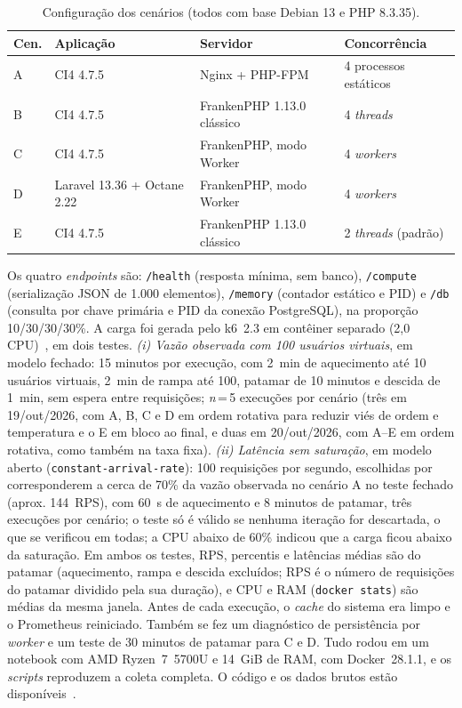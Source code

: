 \documentclass[sigconf, nonacm, screen, language=portuguese, language=spanish, language={main=english}]{acmart}
\begin{document}
\begin{table}[htb]
  \caption{Configuração dos cenários (todos com base Debian 13 e PHP 8.3.35).}
  \label{tab:config}
  \centering
  \footnotesize
  \setlength{\tabcolsep}{3pt}
  \begin{tabular}{llll}
    \toprule
    \textbf{Cen.} & \textbf{Aplicação} & \textbf{Servidor} & \textbf{Concorrência} \\
    \midrule
    A & CI4 4.7.5 & Nginx + PHP-FPM & 4 processos estáticos \\
    B & CI4 4.7.5 & FrankenPHP 1.13.0 clássico & 4 \textit{threads} \\
    C & CI4 4.7.5 & FrankenPHP, modo Worker & 4 \textit{workers} \\
    D & Laravel 13.36 + Octane 2.22 & FrankenPHP, modo Worker & 4 \textit{workers} \\
    E & CI4 4.7.5 & FrankenPHP 1.13.0 clássico & 2 \textit{threads} (padrão) \\
    \bottomrule
  \end{tabular}
\end{table}

Os quatro \textit{endpoints} são: \texttt{/health} (resposta mínima, sem banco), \texttt{/compute} (serialização JSON de 1.000 elementos), \texttt{/memory} (contador estático e PID) e \texttt{/db} (consulta por chave primária e PID da conexão PostgreSQL), na proporção 10/30/30/30\%. A carga foi gerada pelo k6~2.3 em contêiner separado (2,0 CPU)~\cite{grafana2024}, em dois testes. \emph{(i) Vazão observada com 100 usuários virtuais}, em modelo fechado: 15 minutos por execução, com 2~min de aquecimento até 10 usuários virtuais, 2~min de rampa até 100, patamar de 10 minutos e descida de 1~min, sem espera entre requisições; \emph{n}\,=\,5 execuções por cenário (três em 19/out/2026, com A, B, C e D em ordem rotativa para reduzir viés de ordem e temperatura e o E em bloco ao final, e duas em 20/out/2026, com A--E em ordem rotativa, como também na taxa fixa). \emph{(ii) Latência sem saturação}, em modelo aberto (\texttt{constant-arrival-rate}): 100 requisições por segundo, escolhidas por corresponderem a cerca de 70\% da vazão observada no cenário A no teste fechado (aprox. 144~RPS), com 60~s de aquecimento e 8 minutos de patamar, três execuções por cenário; o teste só é válido se nenhuma iteração for descartada, o que se verificou em todas; a CPU abaixo de 60\% indicou que a carga ficou abaixo da saturação. Em ambos os testes, RPS, percentis e latências médias são do patamar (aquecimento, rampa e descida excluídos; RPS é o número de requisições do patamar dividido pela sua duração), e CPU e RAM (\texttt{docker stats}) são médias da mesma janela. Antes de cada execução, o \textit{cache} do sistema era limpo e o Prometheus reiniciado. Também se fez um diagnóstico de persistência por \textit{worker} e um teste de 30 minutos de patamar para C e D. Tudo rodou em um notebook com AMD Ryzen~7~5700U e 14~GiB de RAM, com Docker~28.1.1, e os \textit{scripts} reproduzem a coleta completa. O código e os dados brutos estão disponíveis~\cite{cotb_benchmark_2026}.
\end{document}
